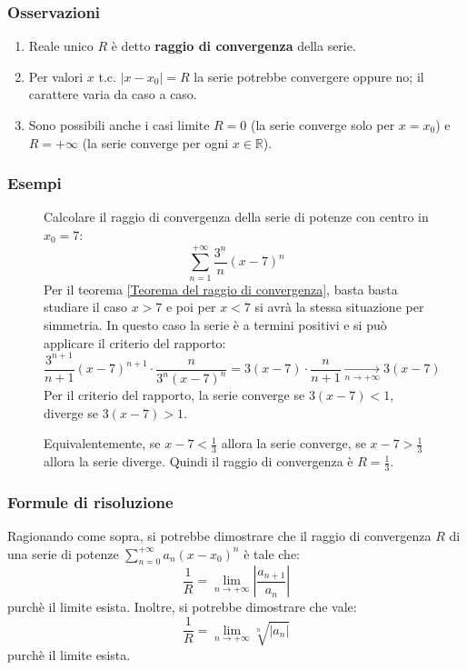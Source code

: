 \documentclass[a4paper]{article}
\theoremstyle{break}
\theoremstyle{break}
\theoremstyle{break}
\theoremstyle{break}
\begin{document}
\subsubsection{Osservazioni}
\begin{enumerate}
  \item Reale unico \( R \) è detto \textbf{raggio di convergenza} della serie.
  \item Per valori \( x \) t.c. \( |x-x_0| = R \) la serie potrebbe convergere oppure no; il carattere varia
    da caso a caso.
  \item Sono possibili anche i casi limite \( R=0 \) (la serie converge solo per \( x=x_0 \)) e \( R=+\infty \)
    (la serie converge per ogni \( x \in \mathbb{R} \)).
\end{enumerate}

\subsubsection{Esempi}
\begin{figure}[H]
  \begin{example}
    Calcolare il raggio di convergenza della serie di potenze con centro in \( x_0 = 7 \):
    \[
    \sum_{n=1}^{+\infty} \frac{3^n}{n}(x-7)^n
    \] 
    Per il teorema \ref{Teorema del raggio di convergenza}, basta basta studiare il caso \( x > 7 \) e poi 
    per \( x < 7 \) si avrà la stessa situazione per simmetria. In questo caso la serie è a termini positivi
    e si può applicare il criterio del rapporto:
    \[
      \frac{3^{n+1}}{n+1}(x-7)^{n+1} \cdot \frac{n}{3^n(x-7)^n} = 3(x-7) \cdot \frac{n}{n+1} \underset{n \to +\infty}{\to } 3(x-7)
    \] 
    Per il criterio del rapporto, la serie converge se \( 3(x-7) < 1 \), diverge se \( 3(x-7) > 1 \).

    Equivalentemente, se \( x-7 < \frac{1}{3} \) allora la serie converge, se \( x-7 > \frac{1}{3} \) allora
    la serie diverge. Quindi il raggio di convergenza è \( R = \frac{1}{3} \).
  \end{example}
\end{figure}

\subsubsection{Formule di risoluzione}
Ragionando come sopra, si potrebbe dimostrare che il raggio di convergenza \( R \) di una serie di potenze
\( \sum_{n=0}^{+\infty} a_n(x-x_0)^n \) è tale che:
\[
\frac{1}{R} = \lim_{n \to +\infty} \left| \frac{a_{n+1}}{a_n} \right|
\] 
purchè il limite esista. Inoltre, si potrebbe dimostrare che vale:
\[
\frac{1}{R} = \lim_{n \to +\infty} \sqrt[n]{|a_n|}
\] 
purchè il limite esista.
\end{document}
